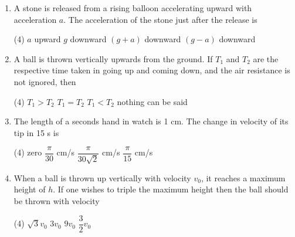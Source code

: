 \documentclass{article}
\renewcommand{\frac}[2]{\dfrac{#1}{#2}}
\begin{document}
\begin{enumerate}
    \item A stone is released from a rising balloon accelerating upward with acceleration \( a \). The acceleration of the stone just after the release is
    \begin{tasks}(4)
        \task \( a \) upward
        \task \( g \) downward
        \task \( (g + a) \) downward
        \task \( (g - a) \) downward
    \end{tasks}

    \item A ball is thrown vertically upwards from the ground. If \( T_1 \) and \( T_2 \) are the respective time taken in going up and coming down, and the air resistance is not ignored, then
    \begin{tasks}(4)
        \task \( T_1 > T_2 \)
        \task \( T_1 = T_2 \)
        \task \( T_1 < T_2 \)
        \task nothing can be said
    \end{tasks}

    \item The length of a seconds hand in watch is 1 cm. The change in velocity of its tip in 15 s is
    \begin{tasks}(4)
        \task zero
        \task \( \frac{\pi}{30} \) cm/s
        \task \( \frac{\pi}{30\sqrt{2}} \) cm/s
        \task \( \frac{\pi}{15} \) cm/s
    \end{tasks}

    \item When a ball is thrown up vertically with velocity \( v_0 \), it reaches a maximum height of \( h \). If one wishes to triple the maximum height then the ball should be thrown with velocity
    \begin{tasks}(4)
        \task \( \sqrt{3} v_0 \)
        \task \( 3 v_0 \)
        \task \( 9 v_0 \)
        \task \( \frac{3}{2} v_0 \)
    \end{tasks}



\end{enumerate}
\end{document}
